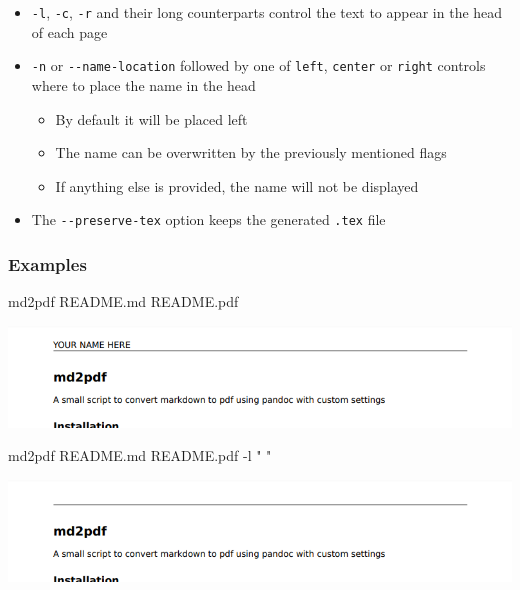 \documentclass[
]{article}
\newenvironment{Shaded}{}{}
\newcommand{\AttributeTok}[1]{\textcolor[rgb]{0.49,0.56,0.16}{#1}}
\newcommand{\ExtensionTok}[1]{#1}
\newcommand{\NormalTok}[1]{#1}
\newcommand{\StringTok}[1]{\textcolor[rgb]{0.25,0.44,0.63}{#1}}
\providecommand{\tightlist}{%
  \setlength{\itemsep}{0pt}\setlength{\parskip}{0pt}}
\begin{document}
\begin{itemize}
\tightlist
\item
  \texttt{-l}, \texttt{-c}, \texttt{-r} and their long counterparts
  control the text to appear in the head of each page
\item
  \texttt{-n} or \texttt{-\/-name-location} followed by one of
  \texttt{left}, \texttt{center} or \texttt{right} controls where to
  place the name in the head

  \begin{itemize}
  \tightlist
  \item
    By default it will be placed left
  \item
    The name can be overwritten by the previously mentioned flags
  \item
    If anything else is provided, the name will not be displayed
  \end{itemize}
\item
  The \texttt{-\/-preserve-tex} option keeps the generated \texttt{.tex}
  file
\end{itemize}

\hypertarget{examples}{%
\subsubsection{Examples}\label{examples}}

\begin{Shaded}
\begin{Highlighting}[]
\ExtensionTok{md2pdf}\NormalTok{ README.md README.pdf}
\end{Highlighting}
\end{Shaded}

\includegraphics{Images/Example1.png}

\begin{Shaded}
\begin{Highlighting}[]
\ExtensionTok{md2pdf}\NormalTok{ README.md README.pdf }\AttributeTok{{-}l} \StringTok{" "}
\end{Highlighting}
\end{Shaded}

\includegraphics{Images/Example2.png}
\end{document}
